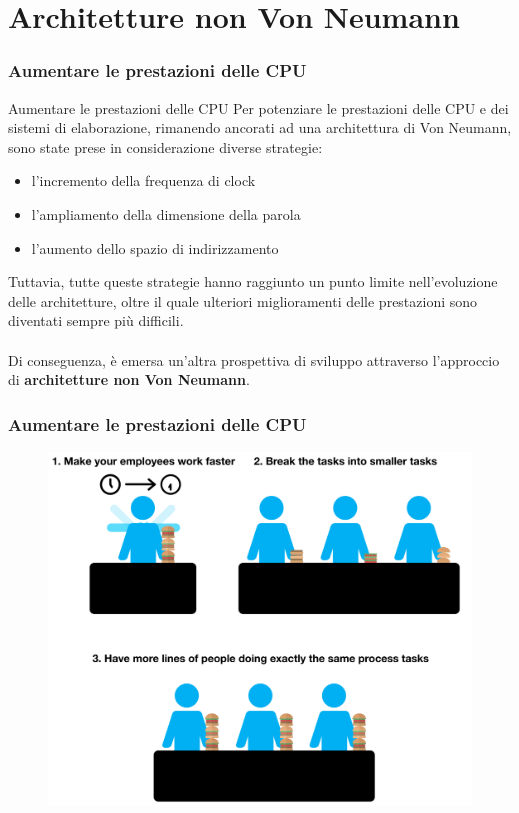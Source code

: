 \section[Architetture non Von Neumann]{Architetture non Von Neumann}
\label{sec:pipeline}
 

\begin{frame}
	\frametitle{Aumentare le prestazioni delle CPU}

	\begin{block}{Aumentare le prestazioni delle CPU}
		Per potenziare le prestazioni delle CPU e dei sistemi di elaborazione, rimanendo ancorati ad una architettura di Von Neumann, sono state prese in considerazione diverse strategie:
		\begin{itemize}
			\item l'incremento della frequenza di clock
			\item l'ampliamento della dimensione della parola
			\item l'aumento dello spazio di indirizzamento
		\end{itemize}
		
		Tuttavia, tutte queste strategie hanno raggiunto un punto limite nell'evoluzione delle architetture, oltre il quale ulteriori miglioramenti delle prestazioni sono diventati sempre più difficili.\\~\\
		
		Di conseguenza, è emersa un'altra prospettiva di sviluppo attraverso l'approccio di \textbf{architetture non Von Neumann}.
	\end{block}

\end{frame}


\begin{frame}
	\frametitle{Aumentare le prestazioni delle CPU}

	\begin{figure}[!htbp]
		\centering
		\includegraphics[width=0.73\linewidth]{images/7_pipeline/faster_cpu.pdf}
	\end{figure}
\end{frame}


